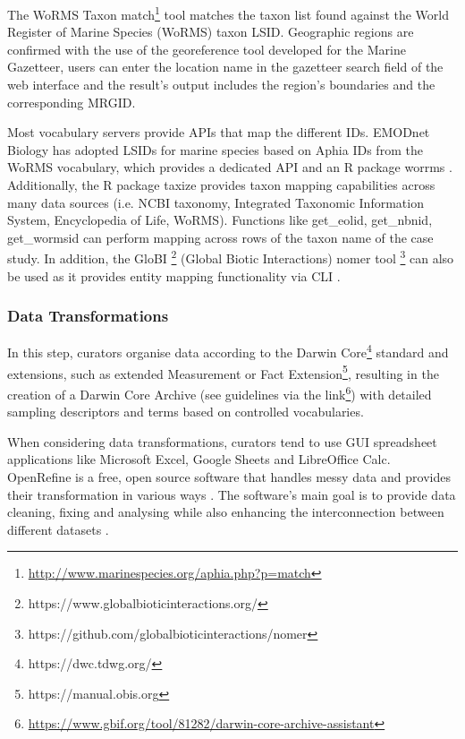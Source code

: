 The WoRMS Taxon match\footnote{\url{http://www.marinespecies.org/aphia.php?p=match}}
tool matches the taxon list found against the World Register of Marine Species
(WoRMS) taxon LSID. Geographic regions are confirmed with the use of the
georeference tool developed for the Marine Gazetteer, users can enter the
location name in the gazetteer search field of the web interface and the
result’s output includes the region’s boundaries and the corresponding MRGID.

Most vocabulary servers provide APIs that map the different IDs. EMODnet Biology
has adopted LSIDs for marine species based on Aphia IDs from the
WoRMS vocabulary, which provides a dedicated API and an R package worrms
\citep{chamberlain_worrms_2020}. Additionally, the R package taxize
\citep{chamberlain_taxize_2013} provides taxon mapping capabilities across many
data sources (i.e. NCBI taxonomy, Integrated Taxonomic Information System,
Encyclopedia of Life, WoRMS). Functions like get\_eolid, get\_nbnid, get\_wormsid
can perform mapping across rows of the taxon name of the case study. In
addition, the GloBI \footnote{https://www.globalbioticinteractions.org/}
(Global Biotic Interactions) nomer tool
\footnote{https://github.com/globalbioticinteractions/nomer}
\citep{poelen_globalbioticinteractionsnomer_2022} can also be used as it
provides entity mapping functionality via CLI \citep{poelen_global_2014}.

   \subsubsection{Data Transformations}
   In this step, curators organise data according to the Darwin
Core\footnote{https://dwc.tdwg.org/} standard and extensions, such as extended
Measurement or Fact Extension\footnote{https://manual.obis.org}, resulting in
the creation of a Darwin Core Archive (see guidelines via the
link\footnote{\url{https://www.gbif.org/tool/81282/darwin-core-archive-assistant}})
with detailed sampling descriptors and terms based on controlled vocabularies.

When considering data transformations, curators tend to use GUI spreadsheet
applications like Microsoft Excel, Google Sheets and LibreOffice Calc.
OpenRefine \citep{https://openrefine.org/} is a free, open source software that
handles messy data and provides their transformation in various
ways \citep{ham_openrefine_2013}. The software’s main goal is to provide data
cleaning, fixing and analysing while also enhancing the interconnection between
different datasets \citep{verborgh_using_2013}.

